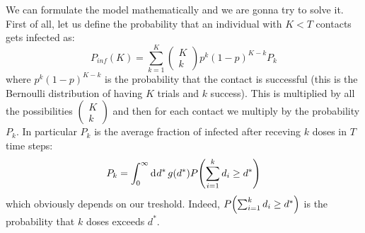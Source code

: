 \documentclass[../main/main.tex]{subfiles}
\begin{document}
We can formulate the model mathematically and we are gonna try to solve it. First of all, let us define the probability that an individual with \( K < T  \) contacts gets infected as:
\begin{equation}
  P_{inf} (K) = \sum_{k=1}^{K} \begin{pmatrix}
  K \\
  k
  \end{pmatrix}
  p^k (1-p)^{K-k} P_k
\end{equation}
where \( p^k (1-p)^{K-k} \) is the probability that the contact is successful (this is the Bernoulli distribution of having \( K \) trials and \( k \) success). This is multiplied by all the possibilities \( \begin{pmatrix}
K \\
k
\end{pmatrix}  \) and then for each contact we multiply by the probability \( P_k \).
In particular  \( P_k \) is the average fraction of infected after receving \( k \) doses in \( T \) time steps:
\begin{equation}
  P_k = \int_{0}^{\infty }  \dd[]{d^*} g(d^*) P \qty(\sum_{i=1}^{k} d_i \ge d^*  )
\end{equation}
which obviously depends on our treshold. Indeed, \(  P \qty(\sum_{i=1}^{k} d_i \ge d^*  )  \) is the probability that \( k \) doses exceeds \( d^* \).
\end{document}
